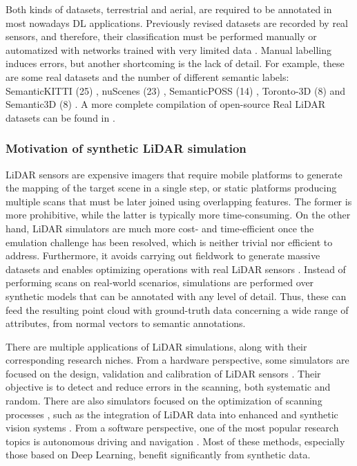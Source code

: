 Both kinds of datasets, terrestrial and aerial, are required to be annotated in most nowadays DL applications. Previously revised datasets are recorded by real sensors, and therefore, their classification must be performed manually \cite{behley_towards_2021, pan_semanticposs_2020, tan_toronto-3d_2020} or automatized with networks trained with very limited data \cite{wu_squeezesegv2_2019}. Manual labelling induces errors, but another shortcoming is the lack of detail. For example, these are some real datasets and the number of different semantic labels: SemanticKITTI (25) \cite{behley_towards_2021}, nuScenes (23) \cite{caesar_nuscenes_2020}, SemanticPOSS (14) \cite{pan_semanticposs_2020}, Toronto-3D (8) \cite{tan_toronto-3d_2020} and Semantic3D (8) \cite{hackel_semantic3d_2017}. A more complete compilation of open-source Real LiDAR datasets can be found in \cite{cai_survey_2022}. 

\subsubsection{Motivation of synthetic LiDAR simulation}

LiDAR sensors are expensive imagers that require mobile platforms to generate the mapping of the target scene in a single step, or static platforms producing multiple scans that must be later joined using overlapping features. The former is more prohibitive, while the latter is typically more time-consuming. On the other hand, LiDAR simulators are much more cost- and time-efficient once the emulation challenge has been resolved, which is neither trivial nor efficient to address. Furthermore, it avoids carrying out fieldwork to generate massive datasets and enables optimizing operations with real LiDAR sensors \cite{mohan_robust_2019, li_3d_2022}. Instead of performing scans on real-world scenarios, simulations are performed over synthetic models that can be annotated with any level of detail. Thus, these can feed the resulting point cloud with ground-truth data concerning a wide range of attributes, from normal vectors to semantic annotations. 

There are multiple applications of LiDAR simulations, along with their corresponding research niches. From a hardware perspective, some simulators are focused on the design, validation and calibration of LiDAR sensors \cite{lee_validation_2020}. Their objective is to detect and reduce errors in the scanning, both systematic and random. There are also simulators focused on the optimization of scanning processes \cite{iqbal_simulation_2020, westling_simtreels_2020}, such as the integration of LiDAR data into enhanced and synthetic vision systems \cite{peinecke_lidar_2008}. From a software perspective, one of the most popular research topics is autonomous driving \cite{fang_augmented_2020, li_deep_2020} and navigation \cite{manivasagam_lidarsim_2020}. Most of these methods, especially those based on Deep Learning, benefit significantly from synthetic data. 

